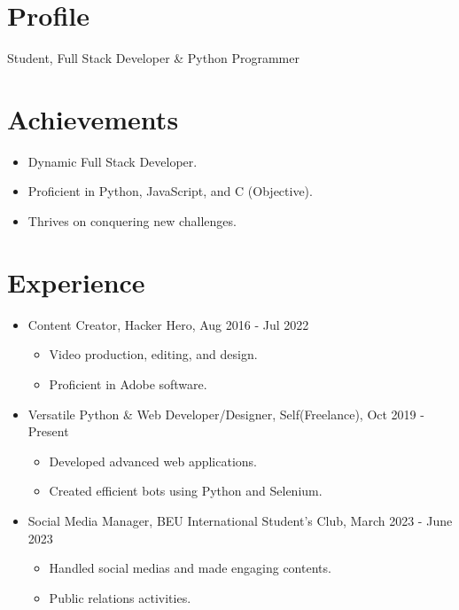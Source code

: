 \documentclass[a4paper,10pt]{article}
\begin{document}
\begin{multicols}{2}


\section*{\textcolor{techblue}{Profile}}
Student, Full Stack Developer \& Python Programmer

\section*{\textcolor{techblue}{Achievements}}
\begin{itemize}
    \item Dynamic Full Stack Developer.
    \item Proficient in Python, JavaScript, and C (Objective).
    \item Thrives on conquering new challenges.
\end{itemize}

\section*{\textcolor{techblue}{Experience}}
\begin{itemize}
    \item Content Creator, Hacker Hero, Aug 2016 - Jul 2022
    \begin{itemize}
        \item Video production, editing, and design.
        \item Proficient in Adobe software.
    \end{itemize}
    \item Versatile Python \& Web Developer/Designer, Self(Freelance), Oct 2019 - Present
    \begin{itemize}
        \item Developed advanced web applications.
        \item Created efficient bots using Python and Selenium.
    \end{itemize}
    \item Social Media Manager, BEU International Student's Club, March 2023 - June 2023
    \begin{itemize}
        \item Handled social medias and made engaging contents.
        \item Public relations activities.
    \end{itemize}
\end{itemize}


\end{multicols}
\end{document}
